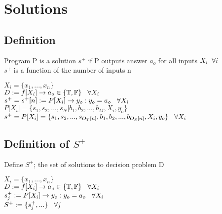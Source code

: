 \documentclass[11pt]{article}
\begin{document}
\section{Solutions}

\subsection{Definition}
Program P is a solution $s^{+}$ if P outputs answer $a_o$ for all inputs $X_i \hspace{2mm} \forall i$\\
$s^+$ is a function of the number of inputs n
\begin{center}
\vspace{1mm}
$
X_i = \{x_1,...,x_n\}
$
\\ \vspace{2mm}
$
D := f \lbrack X_i \rbrack \rightarrow a_{o} \in \{\mathbb{T}, \mathbb{F}\} \hspace{3mm} \forall X_i
$
\\ \vspace{2mm}
$
s^+ = s^+\lbrack n \rbrack := P \lbrack X_i \rbrack \rightarrow y_{o} : y_o = a_{o} \hspace{3mm} \forall X_i
$
\\ \vspace{2mm}
$
P \lbrack X_i \rbrack = \{ s_1,s_2,...,s_N| b_1, b_2,...,b_M,X_i,y_o\}
$
\\ \vspace{3mm}
$
s^+ = P \lbrack X_i \rbrack = \{ s_1,s_2,...,s_{O_T \lbrack n \rbrack }, b_1, b_2,...,b_{O_S \lbrack n \rbrack},X_i,y_o \} \hspace{3mm} \forall X_i
$
\end{center}

\subsection{Definition of $S^+$}
Define $S^+$; the set of solutions to decision problem D
\begin{center}
$
X_i = \{x_1,...,x_n\}
$
\\ \vspace{2mm}
$
D := f \lbrack X_i \rbrack \rightarrow a_{o} \in \{\mathbb{T}, \mathbb{F}\} \hspace{3mm} \forall X_i
$
\\ \vspace{2mm}
$
s_j^+ := P \lbrack X_i \rbrack \rightarrow y_{o} : y_o = a_{o} \hspace{3mm} \forall X_i
$
\\ \vspace{2mm}
$
S^+ := \{s^+_j,...\} \hspace{3mm} \forall j
$
\end{center}
\end{document}
